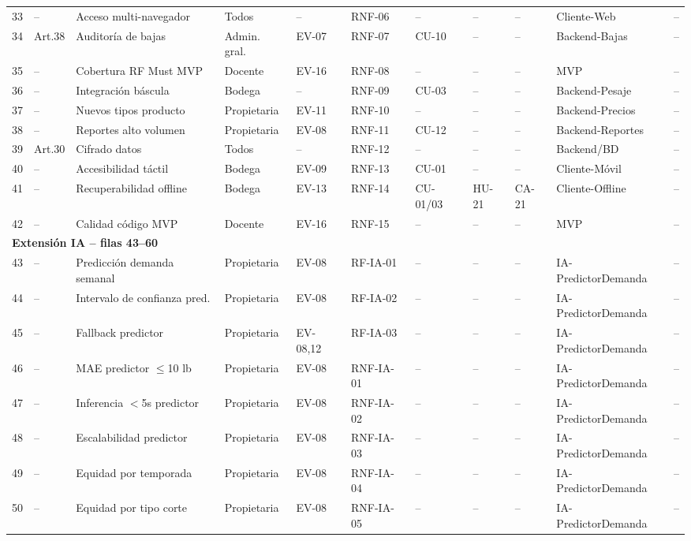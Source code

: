 \documentclass[11pt,a4paper]{article}
\begin{document}
\begin{longtable}{|p{0.3cm}|p{1.2cm}|p{2.2cm}|p{1.5cm}|p{0.7cm}|p{0.8cm}|p{0.7cm}|p{0.8cm}|p{0.8cm}|p{2.3cm}|p{1cm}|}
33 & -- & Acceso multi-navegador & Todos & -- & RNF-06 & -- & -- & -- & Cliente-Web & -- \\
34 & Art.38 & Auditoría de bajas & Admin. gral. & EV-07 & RNF-07 & CU-10 & -- & -- & Backend-Bajas & -- \\
35 & -- & Cobertura RF Must MVP & Docente & EV-16 & RNF-08 & -- & -- & -- & MVP & -- \\
36 & -- & Integración báscula & Bodega & -- & RNF-09 & CU-03 & -- & -- & Backend-Pesaje & -- \\
37 & -- & Nuevos tipos producto & Propietaria & EV-11 & RNF-10 & -- & -- & -- & Backend-Precios & -- \\
38 & -- & Reportes alto volumen & Propietaria & EV-08 & RNF-11 & CU-12 & -- & -- & Backend-Reportes & -- \\
39 & Art.30 & Cifrado datos & Todos & -- & RNF-12 & -- & -- & -- & Backend/BD & -- \\
40 & -- & Accesibilidad táctil & Bodega & EV-09 & RNF-13 & CU-01 & -- & -- & Cliente-Móvil & -- \\
41 & -- & Recuperabilidad offline & Bodega & EV-13 & RNF-14 & CU-01/03 & HU-21 & CA-21 & Cliente-Offline & -- \\
42 & -- & Calidad código MVP & Docente & EV-16 & RNF-15 & -- & -- & -- & MVP & -- \\
\hline
\multicolumn{11}{|l|}{\textbf{Extensión IA -- filas 43--60}} \\
\hline
43 & -- & Predicción demanda semanal & Propietaria & EV-08 & RF-IA-01 & -- & -- & -- & IA-PredictorDemanda & -- \\
44 & -- & Intervalo de confianza pred. & Propietaria & EV-08 & RF-IA-02 & -- & -- & -- & IA-PredictorDemanda & -- \\
45 & -- & Fallback predictor & Propietaria & EV-08,12 & RF-IA-03 & -- & -- & -- & IA-PredictorDemanda & -- \\
46 & -- & MAE predictor $\leq$10 lb & Propietaria & EV-08 & RNF-IA-01 & -- & -- & -- & IA-PredictorDemanda & -- \\
47 & -- & Inferencia $<$5s predictor & Propietaria & EV-08 & RNF-IA-02 & -- & -- & -- & IA-PredictorDemanda & -- \\
48 & -- & Escalabilidad predictor & Propietaria & EV-08 & RNF-IA-03 & -- & -- & -- & IA-PredictorDemanda & -- \\
49 & -- & Equidad por temporada & Propietaria & EV-08 & RNF-IA-04 & -- & -- & -- & IA-PredictorDemanda & -- \\
50 & -- & Equidad por tipo corte & Propietaria & EV-08 & RNF-IA-05 & -- & -- & -- & IA-PredictorDemanda & -- \\

\end{longtable}
\end{document}

